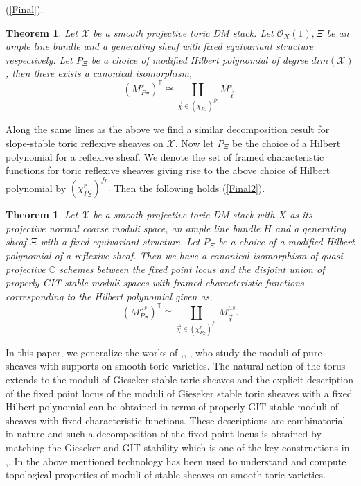 \documentclass[10pt]{amsart}
\newtheorem{thm}[prop]{Theorem}
\newcommand{\sO}{{\mathcal O}}
\newcommand{\sX}{{\mathcal X}}
\numberwithin{equation}{subsection}
\begin{document}
(\ref{Final}).
\begin{thm}
Let $\sX$ be a smooth projective toric DM stack. Let $\sO_{X}(1),\Xi$ be an ample line bundle and a generating sheaf with fixed equivariant structure respectively. Let $P_{\Xi}$ be a choice of modified Hilbert polynomial of degree $dim(\sX)$, then there exists a canonical isomorphism,
$$(M^{s}_{P_{\Xi}})^{\mathbb T} \cong \coprod \limits_{\vec\chi\in (\chi_{P_{\Xi}})^{fr}}M^{s}_{\vec\chi}.$$
\end{thm} \par
Along the same lines as the above we find a similar decomposition result for slope-stable toric reflexive sheaves on $\sX.$ Now let $P_{\Xi}$ be the choice of a Hilbert polynomial for a reflexive sheaf. We denote the set of framed characteristic functions for toric reflexive sheaves giving rise to the above choice of Hilbert polynomial by $(\chi^r_{P_{\Xi}})^{fr}.$ Then the following holds (\ref{Final2}).
\begin{thm}
Let $\sX$ be a smooth projective toric DM stack with $X$ as its projective normal coarse moduli space, an ample line bundle $H$ and a generating sheaf $\Xi$ with a fixed equivariant structure. Let $P_{\Xi}$ be a choice of a modified Hilbert polynomial of a reflexive sheaf. Then we have a canonical isomorphism of quasi-projective $\mathbb C$ schemes between the fixed point locus and the disjoint union of properly GIT stable moduli spaces with framed characteristic functions corresponding to the Hilbert polynomial given as,
$$(M^{\mu s}_{P_{\Xi}})^{\mathbb T} \cong \coprod \limits_{\vec\chi\in (\chi^r_{P_{\Xi}})^{fr}}M^{\mu s}_{\vec\chi}.$$
\end{thm}
In this paper, we generalize the works of \cite{Kly},\cite{Per}, \cite{Koo1},\cite{Koo2} who study the moduli of pure sheaves with supports on smooth toric varieties. The natural action of the torus extends to the   moduli of Gieseker stable toric sheaves and the explicit description of the fixed point locus of the moduli of Gieseker stable toric sheaves with a fixed Hilbert polynomial can be obtained in terms of properly GIT stable moduli of sheaves with fixed characteristic functions. These descriptions are combinatorial in nature and such a decomposition of the fixed point locus is obtained by matching the Gieseker and GIT stability which is one of the key constructions in \cite{Koo1},\cite{Koo2}. In \cite{Koo3} the above mentioned technology has been used to understand and compute topological properties of moduli of stable sheaves on smooth toric varieties.\par
\end{document}

